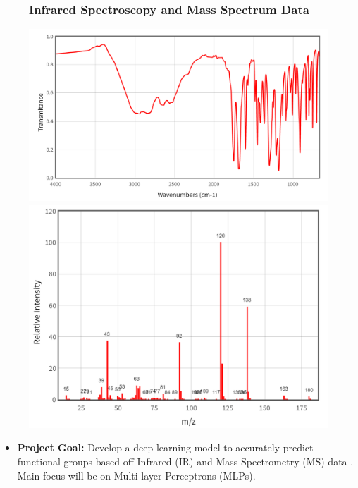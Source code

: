 \documentclass[9pt,hyperref={pdfpagelabels=false},xcolor=table]{beamer}
\begin{document}
\begin{frame}
    \begin{figure}
        \centering
        \frametitle{Infrared Spectroscopy and Mass Spectrum Data}
        \includegraphics[scale=0.35]{aspirin_IR}
        \includegraphics[scale=0.35]{MS _data_aspirin}
    \end{figure}
    \begin{itemize}
        \item \textbf{Project Goal:} Develop a deep learning model to accurately predict functional groups based off Infrared (IR) and Mass Spectrometry (MS) data . Main focus will be on Multi-layer Perceptrons (MLPs).
    \end{itemize}
\end{frame}
\end{document}
